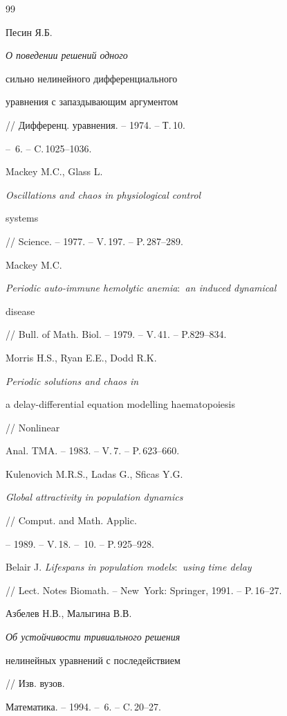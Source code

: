 \begin{thebibliography}{99}







Песин Я.Б. {\em О поведении решений одного 


сильно нелинейного дифференциального


уравнения с запаздывающим аргументом}


// Дифференц. уравнения. -- 1974. -- Т.\,10.


-- \No\,6. -- C.\,1025--1036.




Mackey M.C., Glass L. {\em Oscillations and chaos in physiological control


systems} // Science. -- 1977. -- V.\,197. -- P.\,287--289.




Mackey M.C. {\em Periodic auto-immune hemolytic anemia$:$ an induced dynamical


disease} // Bull. of Math. Biol. -- 1979. -- V.\,41. -- P.829--834.




Morris H.S., Ryan E.E., Dodd R.K. {\em Periodic solutions and chaos in


a delay-differential equation modelling haematopoiesis} // Nonlinear


Anal. TMA. -- 1983. -- V.\,7. -- P.\,623--660.




Kulenovich M.R.S., Ladas G., Sficas Y.G.


{\em Global attractivity in population dynamics}


// Comput. and Math. Applic.


-- 1989. -- V.\,18. -- \No\,10. -- P.\,925--928.




Belair J. {\em Lifespans in population models$:$ using time delay}


// Lect. Notes Biomath. -- New~York: Springer, 1991. -- P.\,16--27.




Азбелев Н.В., Малыгина В.В. {\em Об устойчивости тривиального решения


нелинейных уравнений с последействием} // Изв. вузов.


Математика. -- 1994. -- \No\,6. -- C.\,20--27.





\end{thebibliography}
